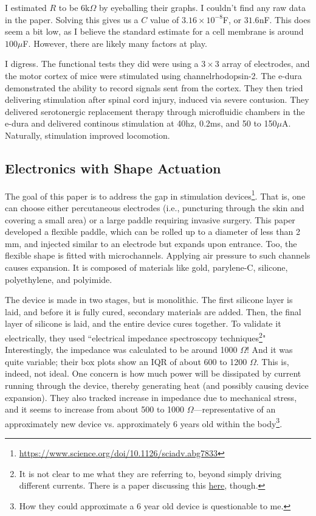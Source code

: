 I estimated $R$ to be $6\mathrm{k}\Omega$ by eyeballing their graphs. I couldn't find any raw data in the paper. Solving this gives us a $C$ value of $3.16\times10^{-8}$F, or $31.6$nF. This does seem a bit low, as I believe the standard estimate for a cell membrane is around $100\mu$F. However, there are likely many factors at play.\newline

I digress. The functional tests they did were using a $3\times3$ array of electrodes, and the motor cortex of mice were stimulated using channelrhodopsin-2. The e-dura demonstrated the ability to record signals sent from the cortex. They then tried delivering stimulation after spinal cord injury, induced via severe contusion. They delivered serotonergic replacement therapy through microfluidic chambers in the e-dura and delivered continous stimulation at 40hz, 0.2ms, and 50 to 150$\mu$A. Naturally, stimulation improved locomotion. 

\subsection{Electronics with Shape Actuation}

The goal of this paper is to address the gap in stimulation devices\footnote{\url{https://www.science.org/doi/10.1126/sciadv.abg7833}}. That is, one can choose either percutaneous electrodes (i.e., puncturing through the skin and covering a small area) or a large paddle requiring invasive surgery. This paper developed a flexible paddle, which can be rolled up to a diameter of less than 2 mm, and injected similar to an electrode but expands upon entrance. Too, the flexible shape is fitted with microchannels. Applying air pressure to such channels causes expansion. It is composed of materials like gold, parylene-C, silicone, polyethylene, and polyimide.\newline 

The device is made in two stages, but is monolithic. The first silicone layer is laid, and before it is fully cured, secondary materials are added. Then, the final layer of silicone is laid, and the entire device cures together. To validate it electrically, they used ``electrical impedance spectroscopy techniques\footnote{It is not clear to me what they are referring to, beyond simply driving different currents. There is a paper discussing this \href{https://www.ncbi.nlm.nih.gov/pmc/articles/PMC8512860/}{here}, though.}" Interestingly, the impedance was calculated to be around 1000 $\Omega$! And it was quite variable; their box plots show an IQR of about 600 to 1200 $\Omega$. This is, indeed, not ideal. One concern is how much power will be dissipated by current running through the device, thereby generating heat (and possibly causing device expansion). They also tracked increase in impedance due to mechanical stress, and it seems to increase from about 500 to 1000 $\Omega$---representative of an approximately new device vs. approximately 6 years old within the body\footnote{How they could approximate a 6 year old device is questionable to me.}.\newline

